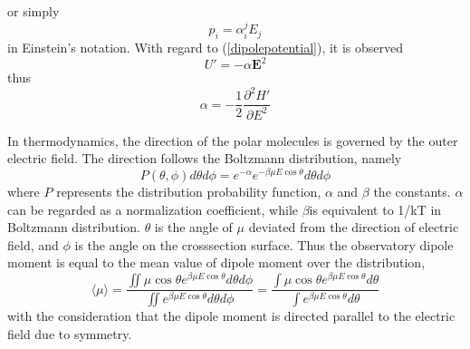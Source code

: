 \documentclass[%
 reprint,
 amsmath,amssymb,
 aps,
10.5pt,
]{revtex4-1}
\begin{document}
  or simply
 \begin{equation}
 	p_i = \alpha^j_i E_j
 \end{equation}
 in Einstein's notation. With regard to (\ref{dipolepotential}), it is observed
 \begin{equation}
 	U' = - \alpha \mathbf{E}^2
 \end{equation}
 thus
 \begin{equation}
 	\alpha = - \frac{1}{2}\frac{\partial^2 H'}{\partial E^2}
 \end{equation}

In thermodynamics, the direction of the polar molecules is governed by the outer electric field. The direction follows the Boltzmann distribution, namely
\begin{equation}
	P(\theta,\phi) d\theta d\phi = e^{-\alpha} e^{-\beta \mu E \cos{\theta}} d\theta d\phi
\end{equation}
where $P$ represents the distribution probability function, $\alpha$ and $\beta$ the constants. $\alpha$ can be regarded as a normalization
coefficient, while $\beta$is equivalent to 1/kT in Boltzmann
distribution. $\theta$ is the angle of $\mu$ deviated from the
direction of electric field, and $\phi$ is the angle on the crosssection
surface. Thus the observatory dipole moment is
equal to the mean value of dipole moment over the distribution,
\begin{equation}
  \langle \mu \rangle = \frac { \iint \mu \cos \theta e ^ { \beta \mu E \cos \theta } d \theta d \phi } { \iint e ^ { \beta \mu E \cos \theta } d \theta d \phi } = \frac { \int \mu \cos \theta e ^ { \beta \mu E \cos \theta } d \theta } { \int e ^ { \beta \mu E \cos \theta } d \theta }
\end{equation}
with the consideration that the dipole moment is directed
parallel to the electric field due to symmetry.
\end{document}
